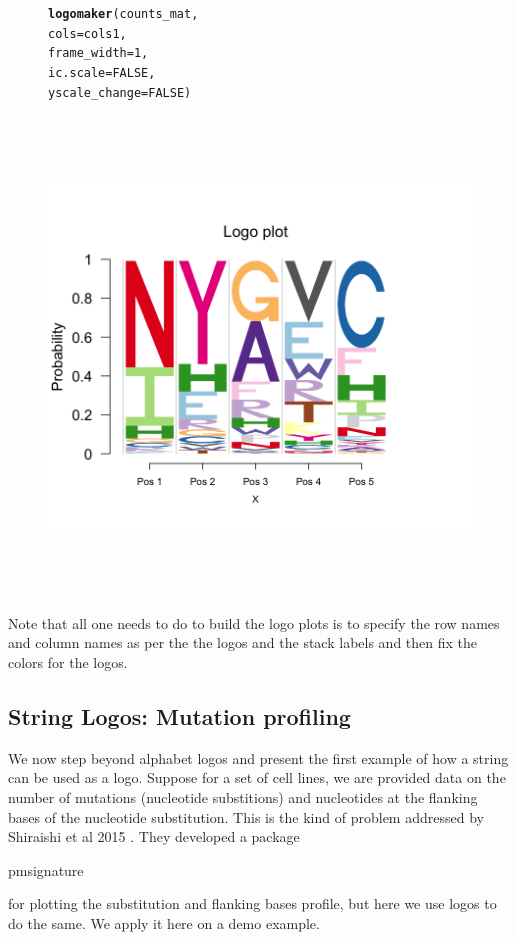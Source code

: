 \documentclass[12pt]{article}\usepackage[]{graphicx}\usepackage[usenames,dvipsnames]{color}
\makeatletter
\newcommand{\hlnum}[1]{\textcolor[rgb]{0.686,0.059,0.569}{#1}}%
\newcommand{\hlstd}[1]{\textcolor[rgb]{0.345,0.345,0.345}{#1}}%
\newcommand{\hlkwc}[1]{\textcolor[rgb]{0.333,0.667,0.333}{#1}}%
\newcommand{\hlkwd}[1]{\textcolor[rgb]{0.737,0.353,0.396}{\textbf{#1}}}%
\newenvironment{kframe}{%
 \def\at@end@of@kframe{}%
 \ifinner\ifhmode%
  \def\at@end@of@kframe{\end{minipage}}%
  \begin{minipage}{\columnwidth}%
 \fi\fi%
 \def\FrameCommand##1{\hskip\@totalleftmargin \hskip-\fboxsep
 \colorbox{shadecolor}{##1}\hskip-\fboxsep
     \hskip-\linewidth \hskip-\@totalleftmargin \hskip\columnwidth}%
 \MakeFramed {\advance\hsize-\width
   \@totalleftmargin\z@ \linewidth\hsize
   \@setminipage}}%
 {\par\unskip\endMakeFramed%
 \at@end@of@kframe}
\newenvironment{knitrout}{}{} %
\makeatother
\begin{document}
\begin{figure}[htp]
\begin{center}
\begin{knitrout}
\begin{kframe}
\begin{alltt}
\hlkwd{logomaker}\hlstd{(counts_mat,}
          \hlkwc{cols}\hlstd{= cols1,}
          \hlkwc{frame_width} \hlstd{=} \hlnum{1}\hlstd{,}
          \hlkwc{ic.scale}  \hlstd{=} \hlnum{FALSE}\hlstd{,}
          \hlkwc{yscale_change} \hlstd{=} \hlnum{FALSE}\hlstd{)}
\end{alltt}
\end{kframe}
\includegraphics[width=6in,height=5in]{figure/logolas_use_5-1} 

\end{knitrout}
\end{center}
\end{figure}

Note that all one needs to do to build the logo plots is to specify the row names and column names as per the the logos and the stack labels and then fix the colors for the logos.

\newpage

\subsection{String Logos: Mutation profiling}

We now step beyond alphabet logos and present the first example of how a string can be used as a logo. Suppose for a set of cell lines, we are provided data on the number of mutations (nucleotide substitions) and nucleotides at the flanking bases of the nucleotide substitution. This is the kind of problem addressed by Shiraishi et al 2015 \cite{Shiraishi2015}. They developed a package \begin{verb} pmsignature \end{verb} for plotting the substitution and flanking bases profile, but here we use logos to do the same. We apply it here on a demo example.
\end{document}
